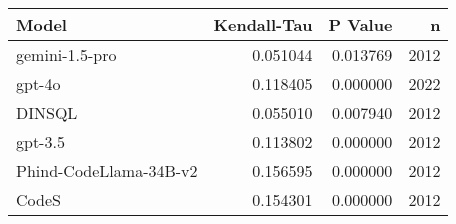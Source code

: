 \begin{tabular}{lrrr}
\toprule
Model & Kendall-Tau & P Value & n \\
\midrule
gemini-1.5-pro & 0.051044 & 0.013769 & 2012 \\
gpt-4o & 0.118405 & 0.000000 & 2022 \\
DINSQL & 0.055010 & 0.007940 & 2012 \\
gpt-3.5 & 0.113802 & 0.000000 & 2012 \\
Phind-CodeLlama-34B-v2 & 0.156595 & 0.000000 & 2012 \\
CodeS & 0.154301 & 0.000000 & 2012 \\
\bottomrule
\end{tabular}
